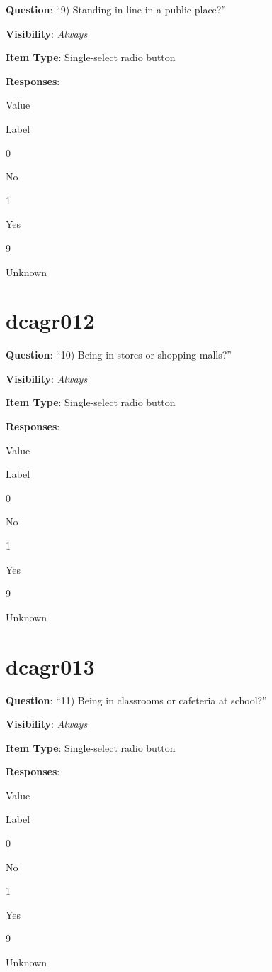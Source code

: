 \documentclass[]{book}
\begin{document}
\textbf{Question}: ``9) Standing in line in a public place?''

\textbf{Visibility}: \emph{Always}

\textbf{Item Type}: Single-select radio button

\textbf{Responses}:

Value

Label

0

No

1

Yes

9

Unknown

\hypertarget{dcagr012}{%
\section{dcagr012}\label{dcagr012}}

\textbf{Question}: ``10) Being in stores or shopping malls?''

\textbf{Visibility}: \emph{Always}

\textbf{Item Type}: Single-select radio button

\textbf{Responses}:

Value

Label

0

No

1

Yes

9

Unknown

\hypertarget{dcagr013}{%
\section{dcagr013}\label{dcagr013}}

\textbf{Question}: ``11) Being in classrooms or cafeteria at school?''

\textbf{Visibility}: \emph{Always}

\textbf{Item Type}: Single-select radio button

\textbf{Responses}:

Value

Label

0

No

1

Yes

9

Unknown
\end{document}
